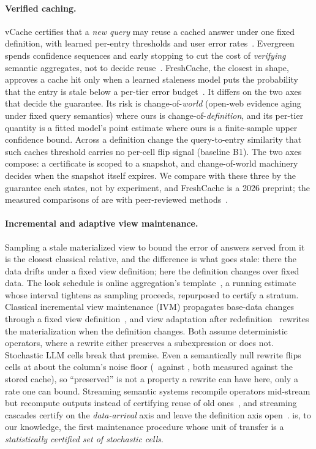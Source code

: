 \keeprunin
\paragraph{Verified caching.} vCache certifies that a \emph{new query}
may reuse a cached answer under one fixed definition, with learned
per-entry thresholds and user error rates~\cite{vcache}. Evergreen
spends confidence sequences and early stopping to cut the cost of
\emph{verifying} semantic aggregates, not to decide
reuse~\cite{evergreen}. FreshCache, the closest in shape, approves a
cache hit only when a learned staleness model puts the probability that
the entry is stale below a per-tier error budget~\cite{freshcache}. It
differs on the two axes that decide the guarantee. Its risk is
change-of-\emph{world} (open-web evidence aging under fixed query
semantics) where ours is change-of-\emph{definition}, and its per-tier
quantity is a fitted model's point estimate where ours is a
finite-sample upper confidence bound. Across a definition change the
query-to-entry similarity that such caches threshold carries no per-cell
flip signal (baseline B1). The two axes compose: a certificate is scoped
to a snapshot, and change-of-world machinery decides when the snapshot
itself expires. We compare with these three by the guarantee each
states, not by experiment, and FreshCache is a 2026 preprint; the
measured comparisons of  are with
peer-reviewed methods~\cite{supg,gptcache}.

\keeprunin
\paragraph{Incremental and adaptive view maintenance.} Sampling a stale
materialized view to bound the error of answers served from
it~\cite{svc} is the closest classical relative, and the difference is
what goes stale: there the data drifts under a fixed view definition;
here the definition changes over fixed data. The look schedule is
online aggregation's template~\cite{ola}, a running estimate whose
interval tightens as sampling proceeds, repurposed to certify a stratum.
Classical incremental view maintenance (IVM) propagates base-data
changes through a fixed view definition~\cite{dbsp}, and view adaptation
after redefinition~\cite{gupta95} rewrites the materialization when the
definition changes. Both assume deterministic operators, where a
rewrite either preserves a subexpression or does not. Stochastic LLM
cells break that premise. Even a semantically null rewrite flips cells
at about the column's noise floor (\flipSoFormatting\ against
\floorIdentityPooled, both measured against the stored cache), so
``preserved'' is not a property a rewrite can have here, only a rate one
can bound. Streaming semantic systems recompile operators mid-stream but
recompute outputs instead of certifying reuse of old
ones~\cite{vectraflow,contprompts}, and streaming cascades certify on the
\emph{data-arrival} axis and leave the definition axis
open~\cite{streamcascades}. \sivm{} is, to our knowledge, the first
maintenance procedure whose unit of transfer is a \emph{statistically
certified set of stochastic cells}.

